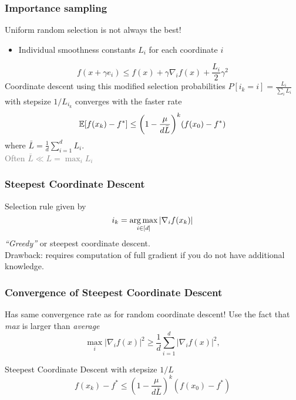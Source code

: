 \documentclass[aspectratio=149]{beamer}
\begin{document}
\begin{frame}
  \frametitle{Importance sampling}
  \begin{center}
    Uniform random selection is not always the best!
  \end{center}
  \begin{itemize}
    \item Individual smoothness constants $L_i$ for each coordinate $i$
  \end{itemize}
  \begin{equation}
    f(x+ \gamma e_i) \le f(x) + \gamma \nabla_i f(x) + \frac{L_i}{2} \gamma^2
  \end{equation}
  Coordinate descent using this modified selection probabilities $P[i_k=i] = \frac{L_i}{\sum_i L_i}$ with stepsize
  $1/L_{i_k}$ converges with the faster rate
  \begin{equation}
      \mathbb{E} [f(x_k)- f^*] \le {\left(1 - \frac{\mu}{d \bar{L}}\right)}^k (f(x_0)-f^*)
  \end{equation}
  where $\bar{L}= \frac{1}{d} \sum_{i=1}^{d}L_i$.\\
  \hfill\textcolor{gray}{Often $\bar{L} \ll L = \max_i L_i$}
\end{frame}

\begin{frame}
  \frametitle{Steepest Coordinate Descent}
  Selection rule given by
  \begin{equation}
    i_k = \operatorname*{arg\,max}_{i\in [d]} \vert \nabla_i f(x_k) \vert
  \end{equation}
  \emph{``Greedy''} or steepest coordinate descent.\\
  Drawback: requires computation of full gradient if you do not have additional knowledge.

\end{frame}

\begin{frame}
  \frametitle{Convergence of Steepest Coordinate Descent}
  Has same convergence rate as for random coordinate descent!
  Use the fact that \emph{max} is larger than \emph{average}
  \begin{equation}
    \max_i \vert \nabla_i f(x) \vert^2 \ge  \frac{1}{d} \sum_{i=1}^{d} \vert \nabla_i f(x) \vert^2,
  \end{equation}
  \begin{corollary}%
    Steepest Coordinate Descent with stepsize $1/L$
  \begin{equation}
      f(x_k)- f^* \le {\left(1 - \frac{\mu}{d \bar{L}}\right)}^k (f(x_0)-f^*)
  \end{equation}
  \end{corollary}
\end{frame}
\end{document}
